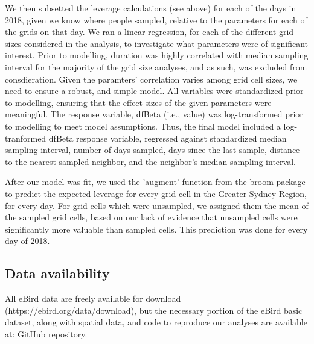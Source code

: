 \documentclass[9pt,twocolumn,twoside,lineno]{pnas-new}
\begin{document}
{We then subsetted the leverage calculations (see above) for each of the days in 2018, given we know where people sampled, relative to the parameters for each of the grids on that day. We ran a linear regression, for each of the different grid sizes considered in the analysis, to investigate what parameters were of significant interest. Prior to modelling, duration was highly correlated with median sampling interval for the majority of the grid size analyses, and as such, was excluded from consdieration. Given the paramters' correlation varies among grid cell sizes, we need to ensure a robust, and simple model. All variables were standardized prior to modelling, ensuring that the effect sizes of the given parameters were meaningful. The response variable, dfBeta (i.e., value) was log-transformed prior to modelling to meet model assumptions. Thus, the final model included a log-tranformed dfBeta response variable, regressed against standardized median sampling interval, number of days sampled, days since the last sample, distance to the nearest sampled neighbor, and the neighbor's median sampling interval.

After our model was fit, we used the 'augment' function from the broom package \cite{robinson2018broom} to predict the expected leverage for every grid cell in the Greater Sydney Region, for every day. For grid cells which were unsampled, we assigned them the mean of the sampled grid cells, based on our lack of evidence that unsampled cells were significantly more valuable than sampled cells. This prediction was done for every day of 2018.

\subsection*{Data availability} All eBird data are freely available for download (https://ebird.org/data/download), but the necessary portion of the eBird basic dataset, along with spatial data, and code to reproduce our analyses are available at: GitHub repository.
}

\showmatmethods{} %


\showacknow{} %


\end{document}
